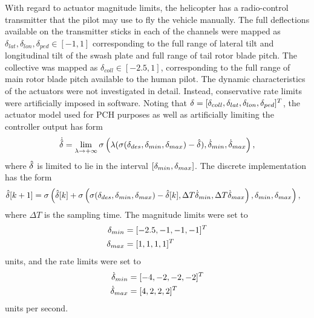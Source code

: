 \label{r:actuatorlimits}With regard to actuator magnitude limits,
the helicopter has a radio-control transmitter that the pilot may
use to fly the vehicle manually. The full deflections available on
the transmitter sticks in each of the channels were mapped as
$\delta_{lat},\delta_{lon},\delta_{ped} \in [-1,1]$ corresponding to
the full range of lateral tilt and longitudinal tilt of the swash
plate and full range of tail rotor blade pitch. The collective was
mapped as $\delta_{coll} \in [-2.5,1]$, corresponding to the full
range of main rotor blade pitch available to the human pilot. The
dynamic characteristics of the actuators were not investigated in
detail. Instead, conservative rate limits were artificially imposed
in software. Noting that $\delta =
[\delta_{coll},\delta_{lat},\delta_{lon},\delta_{ped}]^T$, the
actuator model used for PCH purposes as well as artificially
limiting the controller output has form
\begin{equation}
\label{e:ghatcontinuous} \dot{\hat{\delta}} = \lim_{\lambda
\rightarrow +\infty} \sigma\left(\lambda(\sigma(\delta_{des},
\delta_{min},\delta_{max}) - \hat{\delta}),\dot{\delta}_{min},\dot{\delta}_{max} \right),
\end{equation}
where $\hat{\delta}$ is limited to lie in the interval
$[\delta_{min},\delta_{max}]$. The discrete implementation has the form
\begin{equation}
\label{e:ghatdiscrete}
\begin{split}
\hat{\delta}&[k+1] = \sigma\left(\hat{\delta}[k] +
\sigma\left(\sigma(\delta_{des},\delta_{min},\delta_{max}) -
\hat{\delta}[k],\Delta T\dot{\delta}_{min},\Delta T\dot{\delta}_{max}\right), \delta_{min},
\delta_{max}\right),
\end{split}
\end{equation}
where $\Delta T$ is the sampling time. The magnitude limits were set
to
\begin{align}
\label{e:magnitudelimits}
\delta_{min} &= [-2.5,-1,-1,-1]^T \nonumber\\
\delta_{max} &= [1,1,1,1]^T
\end{align}
units, and the rate limits were set to
\begin{align}
\label{e:ratelimits}
\dot{\delta}_{min} &= [-4,-2,-2,-2]^T\nonumber\\
\dot{\delta}_{max} &= [4,2,2,2]^T
\end{align}
units per second.

